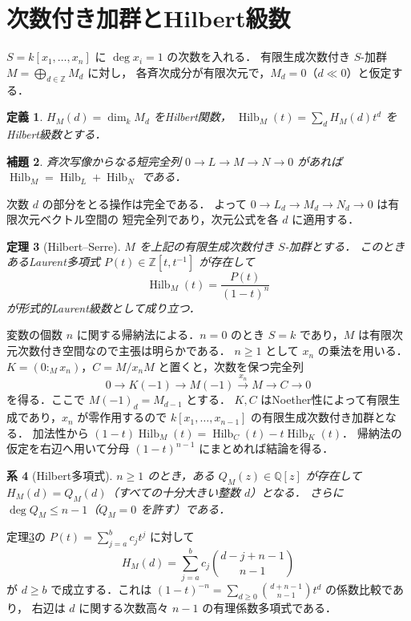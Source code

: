 \documentclass[a5paper,10pt,onecolumn]{jsarticle}
\makeatletter
\theoremstyle{mathnotetheorem}
\newtheorem{theorem}{定理}[section]
\newtheorem{definition}[theorem]{定義}
\newtheorem{lemma}[theorem]{補題}
\newtheorem{corollary}[theorem]{系}
\renewcommand{\proofname}{証明}
\renewenvironment{proof}[1][\proofname]{%
  \par\pushQED{\qed}\normalfont\topsep4\p@\@plus2\p@\relax
  \trivlist\item[\hskip\labelsep\bfseries #1]\ignorespaces
}{\popQED\endtrivlist\@endpefalse}
\makeatother
\begin{document}
\section{次数付き加群とHilbert級数}
$S=k[x_1,\ldots,x_n]$ に $\deg x_i=1$ の次数を入れる．
有限生成次数付き $S$-加群 $M=\bigoplus_{d\in\mathbb Z}M_d$ に対し，
各斉次成分が有限次元で，$M_d=0$（$d\ll0$）と仮定する．
\begin{definition}
$H_M(d)=\dim_k M_d$ をHilbert関数，
$\operatorname{Hilb}_M(t)=\sum_d H_M(d)t^d$ をHilbert級数とする．
\end{definition}
\begin{lemma}
斉次写像からなる短完全列
$0\to L\to M\to N\to0$ があれば
$\operatorname{Hilb}_M=\operatorname{Hilb}_L+\operatorname{Hilb}_N$ である．
\end{lemma}
\begin{proof}
次数 $d$ の部分をとる操作は完全である．
よって $0\to L_d\to M_d\to N_d\to0$ は有限次元ベクトル空間の
短完全列であり，次元公式を各 $d$ に適用する．
\end{proof}
\begin{theorem}[Hilbert--Serre]\label{thm:HS}
$M$ を上記の有限生成次数付き $S$-加群とする．
このときあるLaurent多項式 $P(t)\in\mathbb Z[t,t^{-1}]$ が存在して
\[
 \operatorname{Hilb}_M(t)=\frac{P(t)}{(1-t)^n}
\]
が形式的Laurent級数として成り立つ．
\end{theorem}
\begin{proof}
変数の個数 $n$ に関する帰納法による．$n=0$ のとき
$S=k$ であり，$M$ は有限次元次数付き空間なので主張は明らかである．
$n\ge1$ として $x_n$ の乗法を用いる．
$K=(0:_M x_n)$，$C=M/x_nM$ と置くと，次数を保つ完全列
\[
 0\longrightarrow K(-1)\longrightarrow M(-1)
 \xrightarrow{x_n} M\longrightarrow C\longrightarrow0
\]
を得る．ここで $M(-1)_d=M_{d-1}$ とする．
$K,C$ はNoether性によって有限生成であり，$x_n$ が零作用するので
$k[x_1,\ldots,x_{n-1}]$ の有限生成次数付き加群となる．
加法性から
$ (1-t)\operatorname{Hilb}_M(t)
   =\operatorname{Hilb}_C(t)-t\operatorname{Hilb}_K(t)$．
帰納法の仮定を右辺へ用いて分母 $(1-t)^{n-1}$ にまとめれば結論を得る．
\end{proof}
\begin{corollary}[Hilbert多項式]
$n\ge1$ のとき，ある $Q_M(z)\in\mathbb Q[z]$ が存在して
$H_M(d)=Q_M(d)$（すべての十分大きい整数 $d$）となる．
さらに $\deg Q_M\le n-1$（$Q_M=0$ を許す）である．
\end{corollary}
\begin{proof}
定理\ref{thm:HS}の $P(t)=\sum_{j=a}^b c_jt^j$ に対して
\[
 H_M(d)=\sum_{j=a}^b c_j{d-j+n-1\choose n-1}
\]
が $d\ge b$ で成立する．これは
$(1-t)^{-n}=\sum_{d\ge0}{d+n-1\choose n-1}t^d$ の係数比較であり，
右辺は $d$ に関する次数高々 $n-1$ の有理係数多項式である．
\end{proof}
\end{document}
